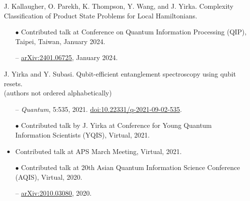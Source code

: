 \documentclass[11pt,letterpaper,serif]{moderncv}
\begin{document}
J. Kallaugher, O. Parekh, K. Thompson, Y. Wang, and J. Yirka.\quad
Complexity Classification of Product State Problems for Local Hamiltonians.
\begin{adjustwidth}{.1in}{}
	\begin{itemize}
		\item[$\bullet$] Contributed talk at Conference on Quantum Information Processing (QIP), Taipei, Taiwan, January 2024.
		\item[--] \href{https://arxiv.org/abs/2401.06725}{arXiv:2401.06725}, January 2024.
	\end{itemize}
\end{adjustwidth}
\medskip

J. Yirka and Y. Subasi.\quad
Qubit-efficient entanglement spectroscopy using qubit resets.
\\{\footnotesize (authors not ordered alphabetically)}
\begin{adjustwidth}{.1in}{}
	\begin{itemize}
		\item[--] \textit{Quantum}, 5:535, 2021.\quad
		\href{https://doi.org/10.22331/q-2021-09-02-535}{doi:10.22331/q-2021-09-02-535}.
		\item[$\bullet$] Contributed talk by J. Yirka at Conference for Young Quantum Information Scientists (YQIS), Virtual, 2021.
		\item Contributed talk at APS March Meeting, Virtual, 2021.
		\item[$\bullet$] Contributed talk at 20th Asian Quantum Information Science Conference (AQIS), Virtual, 2020.
		\item[--] \href{https://arxiv.org/abs/2010.03080}{arXiv:2010.03080}, 2020.
	\end{itemize}
\end{adjustwidth}
\medskip
\end{document}
